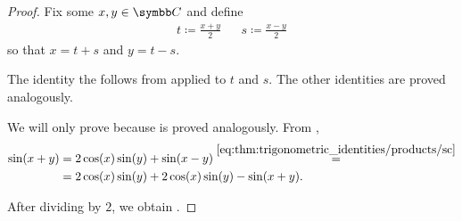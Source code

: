 \begin{proof}
   Fix some \( x, y \in \BC \) and define
  \begin{align*}
    t \coloneqq \frac {x + y} 2
     &  &
    s \coloneqq \frac {x - y} 2
  \end{align*}
  so that \( x = t + s \) and \( y = t - s \).

  The identity  the follows from  applied to \( t \) and \( s \). The other identities are proved analogously.

   We will only prove  because  is proved analogously. From ,
  \begin{align*}
    \sin(x + y)
     & =
    2 \cos(x) \sin(y) + \sin(x - y)
    \overset {\ref{eq:thm:trigonometric_identities/products/sc}} = \\ &=
    2 \cos(x) \sin(y) + 2 \cos(x) \sin(y) - \sin(x + y).
  \end{align*}

  After dividing by \( 2 \), we obtain .
\end{proof}

